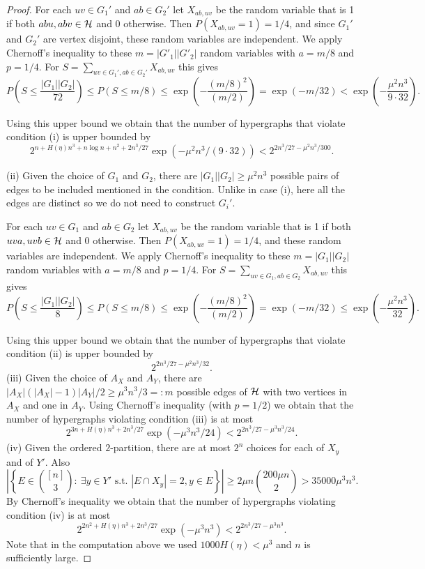 \documentclass[11pt]{article}
\begin{document}
\begin{proof}
For each $uv \in G_1'$ and $ab \in G_2'$ let $X_{ab, uv}$ be the random variable that is 1 if both $abu, abv \in \mathcal{H}$ and 0 otherwise.  Then $P(X_{ab, uv}=1)=1/4$, and since $G_1'$ and $G_2'$ are vertex disjoint, these random variables are independent.
We apply Chernoff's
inequality to these $m=|G'_1||G'_2|$ random variables with
 $a=m/8$ and $p=1/4$.  For $S=\sum_{uv \in G_1', ab \in G_2'}X_{ab, uv}$ this gives
 $$P\left(S\le \frac{|G_1||G_2|}{72}\right)\le P(S\le m/8) \le \exp\left(-\frac{(m/8)^2}{(m/2)}\right)=\exp(-m/32)<\exp\left(-\frac{\mu^2 n^3}{9\cdot 32}\right).$$

  Using this upper bound  we obtain that the number of hypergraphs that violate condition (i) is upper
bounded by
 $$2^{n+H(\eta)n^3+ n\log n+n^2+2n^3/27}\exp(-\mu^2 n^3/(9\cdot 32))< 2^{2n^3/27-\mu^2n^3/300}.$$

(ii) Given  the choice of $G_1$ and $G_2$,
 there are  $|G_1||G_2| \ge \mu^2 n^3$
possible pairs of  edges to be included mentioned in the
condition. Unlike in case (i), here all the edges are distinct so we do not need to construct $G_i'$.


For each $uv \in G_1$ and $ab \in G_2$ let $X_{ab, uv}$ be the random variable that is 1 if both $uva, uvb \in \mathcal{H}$ and 0 otherwise.  Then $P(X_{ab, uv}=1)=1/4$, and these random variables are independent.
We apply Chernoff's
inequality to these $m=|G_1||G_2|$ random variables with
 $a=m/8$ and $p=1/4$.  For $S=\sum_{uv \in G_1, ab \in G_2}X_{ab, uv}$ this gives
 $$P\left(S\le \frac{|G_1||G_2|}{8}\right)\le P(S\le m/8) \le \exp\left(-\frac{(m/8)^2}{(m/2)}\right)=\exp(-m/32)
 \le \exp\left(-\frac{\mu^2 n^3}{32}\right).$$

 Using this upper bound  we obtain that the number of hypergraphs that violate condition (ii) is upper
bounded by
 $$2^{2n^3/27-\mu^2n^3/32}.$$
 (iii) Given  the choice of $A_X$ and $A_Y$,  there are
$|A_X|(|A_X|-1)|A_Y|/2 \ge \mu^3 n^3/3=:m$ possible edges  of $\mathcal{H}$ with
two vertices in $A_X$ and one in $A_Y$.
 Using  Chernoff's inequality (with
$p=1/2$) we obtain that the number of hypergraphs violating
condition (iii) is at most   $$2^{3n+H(\eta)n^3+ 2n^3/27}\exp(-\mu^3
n^3/24)<2^{2n^3/27-\mu^3 n^3/24}.$$
(iv)  Given the ordered $2$-partition,  there are at most $2^n$
choices for each of $X_y$ and of $Y'$. Also  $$\left|\left\{E\in
\binom{[n]}{3}: \ \exists y\in Y' \text{ s.t. } |E\cap X_y|=2, y\in
E \right\}\right| \ge 2\mu n {200 \mu n \choose 2}>
 35000\mu^3 n^3.$$ By  Chernoff's inequality we obtain
that the number of hypergraphs violating condition (iv) is at
most
$$2^{2n^2+ H(\eta)n^3+ 2n^3/27}\exp(-\mu^3 n^3)<2^{2n^3/27-\mu^3 n^3}.$$
Note that in the computation above we used  $1000H(\eta)< \mu^3$ and
$n$ is sufficiently large.


\end{proof}
\end{document}

